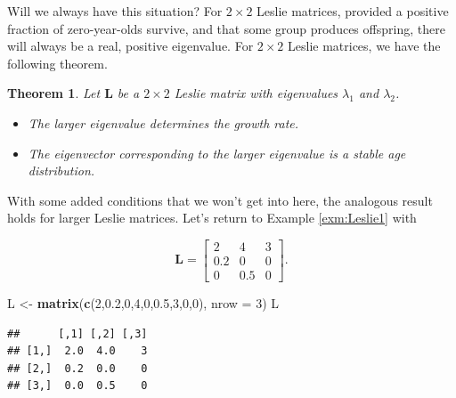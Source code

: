 \documentclass[
]{book}
\newenvironment{Shaded}{\begin{snugshade}}{\end{snugshade}}
\newcommand{\AttributeTok}[1]{\textcolor[rgb]{0.13,0.29,0.53}{#1}}
\newcommand{\DecValTok}[1]{\textcolor[rgb]{0.00,0.00,0.81}{#1}}
\newcommand{\FloatTok}[1]{\textcolor[rgb]{0.00,0.00,0.81}{#1}}
\newcommand{\FunctionTok}[1]{\textcolor[rgb]{0.13,0.29,0.53}{\textbf{#1}}}
\newcommand{\NormalTok}[1]{#1}
\newcommand{\OtherTok}[1]{\textcolor[rgb]{0.56,0.35,0.01}{#1}}
\providecommand{\tightlist}{%
  \setlength{\itemsep}{0pt}\setlength{\parskip}{0pt}}
\newtheorem{theorem}{Theorem}[chapter]
\theoremstyle{definition}
\theoremstyle{definition}
\theoremstyle{definition}
\theoremstyle{definition}
\theoremstyle{remark}
\begin{document}
Will we always have this situation? For \(2\times 2\) Leslie matrices, provided a positive fraction of zero-year-olds survive, and that some group produces offspring, there will always be a real, positive eigenvalue. For \(2\times 2\) Leslie matrices, we have the following theorem.\autocite{Neuhauser}

\begin{theorembox}

\begin{theorem}

Let \(\mathbf{L}\) be a \(2\times 2\) Leslie matrix with eigenvalues \(\lambda_1\) and \(\lambda_2\).

\begin{itemize}
\tightlist
\item
  The larger eigenvalue determines the growth rate.
\item
  The eigenvector corresponding to the larger eigenvalue is a stable age distribution.
\end{itemize}

\end{theorem}

\end{theorembox}

With some added conditions that we won't get into here, the analogous result holds for larger Leslie matrices. Let's return to Example \ref{exm:Leslie1} with

\[\mathbf{L}=\begin{bmatrix} 2 & 4 & 3\\
0.2 & 0 & 0\\ 0 & 0.5 & 0\end{bmatrix}.\]

\begin{Shaded}
\begin{Highlighting}[]
\NormalTok{L }\OtherTok{\textless{}{-}} \FunctionTok{matrix}\NormalTok{(}\FunctionTok{c}\NormalTok{(}\DecValTok{2}\NormalTok{,}\FloatTok{0.2}\NormalTok{,}\DecValTok{0}\NormalTok{,}\DecValTok{4}\NormalTok{,}\DecValTok{0}\NormalTok{,}\FloatTok{0.5}\NormalTok{,}\DecValTok{3}\NormalTok{,}\DecValTok{0}\NormalTok{,}\DecValTok{0}\NormalTok{), }\AttributeTok{nrow =} \DecValTok{3}\NormalTok{)}
\NormalTok{L}
\end{Highlighting}
\end{Shaded}

\begin{verbatim}
##      [,1] [,2] [,3]
## [1,]  2.0  4.0    3
## [2,]  0.2  0.0    0
## [3,]  0.0  0.5    0
\end{verbatim}
\end{document}
